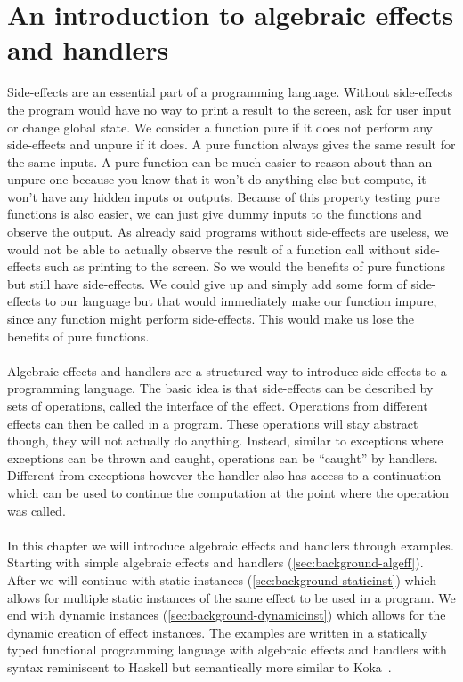 \chapter{\label{chap:algintro}An introduction to algebraic effects and handlers}

Side-effects are an essential part of a programming language. Without side-effects the program would have no way to print a result to the screen, ask for user input or change global state. We consider a function pure if it does not perform any side-effects and unpure if it does. A pure function always gives the same result for the same inputs. A pure function can be much easier to reason about than an unpure one because you know that it won't do anything else but compute, it won't have any hidden inputs or outputs. Because of this property testing pure functions is also easier, we can just give dummy inputs to the functions and observe the output. As already said programs without side-effects are useless, we would not be able to actually observe the result of a function call without side-effects such as printing to the screen. So we would the benefits of pure functions but still have side-effects. We could give up and simply add some form of side-effects to our language but that would immediately make our function impure, since any function might perform side-effects. This would make us lose the benefits of pure functions.
\\\\
Algebraic effects and handlers are a structured way to introduce side-effects to a programming language.
The basic idea is that side-effects can be described by sets of operations, called the interface of the effect.
Operations from different effects can then be called in a program.
These operations will stay abstract though, they will not actually do anything.
Instead, similar to exceptions where exceptions can be thrown and caught, operations can be ``caught'' by handlers.
Different from exceptions however the handler also has access to a continuation which can be used to continue the computation at the point where the operation was called.
\\\\
In this chapter we will introduce algebraic effects and handlers through examples.
Starting with simple algebraic effects and handlers (\cref{sec:background-algeff}).
After we will continue with static instances (\cref{sec:background-staticinst}) which allows for multiple static instances of the same effect to be used in a program.
We end with dynamic instances (\cref{sec:background-dynamicinst}) which allows for the dynamic creation of effect instances. The examples are written in a statically typed functional programming language with algebraic effects and handlers with syntax reminiscent to Haskell but semantically more similar to Koka~\autocite{koka2}.


